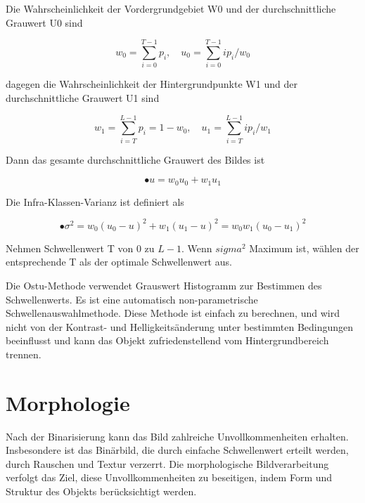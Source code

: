 Die Wahrscheinlichkeit der Vordergrundgebiet W0 und der durchschnittliche Grauwert U0 sind

\begin{equation}
  w_{0} = \sum_{i=0}^{T-1} p_{i},\quad u_{0} = \sum_{i=0}^{T-1} ip_{i}/w_{0}
\end{equation}

dagegen die Wahrscheinlichkeit der Hintergrundpunkte W1 und der durchschnittliche Grauwert U1 sind

\begin{equation}
  w_{1} = \sum_{i=T}^{L-1} p_{i} = 1-w_{0},\quad u_{1} = \sum_{i=T}^{L-1} ip_{i}/w_{1}
\end{equation}

Dann das gesamte durchschnittliche Grauwert des Bildes ist

\begin{equation}
• u = w_{0}u_{0} + w_{1}u_{1}
\end{equation}

Die Infra-Klassen-Varianz ist definiert als

\begin{equation}
•\sigma^2 = w_{0}(u_{0} - u)^2 + w_{1}(u_{1} - u)^2 = w_{0}w_{1}(u_{0} - u_{1})^2
\end{equation}

Nehmen Schwellenwert T von 0 zu $ L-1 $. Wenn $ sigma^2 $ Maximum ist, wählen der entsprechende T als der optimale Schwellenwert aus.

Die Ostu-Methode verwendet Grauswert Histogramm zur Bestimmen des Schwellenwerts. Es ist eine automatisch non-parametrische Schwellenauswahlmethode. Diese Methode ist einfach zu berechnen, und wird nicht von der Kontrast- und Helligkeitsänderung unter bestimmten Bedingungen beeinflusst und kann das Objekt zufriedenstellend vom Hintergrundbereich trennen.

















\section{Morphologie}

Nach der Binarisierung kann das Bild zahlreiche Unvollkommenheiten erhalten. Insbesondere ist das Binärbild, die durch einfache Schwellenwert erteilt werden, durch Rauschen und Textur verzerrt. Die morphologische Bildverarbeitung verfolgt das Ziel, diese Unvollkommenheiten zu beseitigen, indem Form und Struktur des Objekts berücksichtigt werden.

